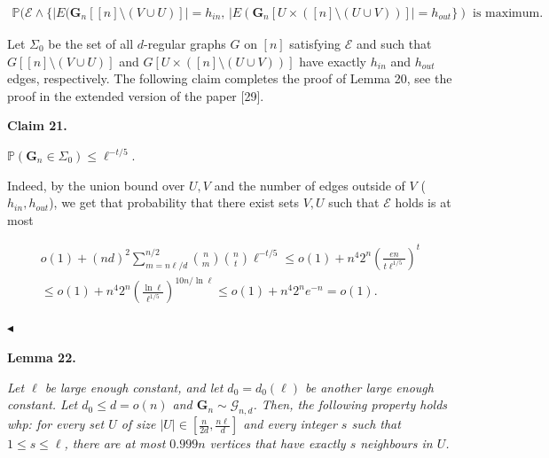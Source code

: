 \documentclass[10pt,a4paper]{article}
\begin{document}
\[\begin{gathered}
\mathbb{P}(\mathcal{E}\wedge\{|E(\mathbf{G}_{n}[[n]\setminus(V\cup U)]|=h_{in},\,|E(\mathbf{G}_{n}[U\times([n]\setminus(U\cup V))]|=h_{out}\})\text{ is maximum}.
\end{gathered}\]


Let $\Sigma_{0}$ be the set of all $d$-regular graphs $G$ on $[n]$ satisfying $\mathcal{E}$ and such that $G[[n]\setminus(V\cup U)]$ and $G[U\times([n]\setminus(U\cup V))]$ have exactly $h_{in}$ and $h_{out}$ edges, respectively. The following claim completes the proof of Lemma 20, see the proof in the extended version of the paper [29].\par





\par\medskip\noindent\textbf{
Claim 21. 
}\par



$\mathbb{P}(\mathbf{G}_{n}\in\Sigma_{0})\leq\ell^{-t/5}$.\par






Indeed, by the union bound over $U,V$ and the number of edges outside of $V$ ($h_{in},h_{out}$), we get that probability that there exist sets $V,U$ such that $\mathcal{E}$ holds is at most\par


\[\begin{gathered}
\displaystyle o(1)+(nd)^{2} \displaystyle\sum_{m=n\ell/d}^{n/2}{n\choose m}{n\choose t}\ell^{-t/5}\leq o(1)+n^{4}2^{n}\left(\frac{en}{t\ell^{1/5}}\right)^{t} \\
\displaystyle\leq o(1)+n^{4}2^{n}\left(\frac{\ln\ell}{\ell^{1/5}}\right)^{10n/\ln\ell}\leq o(1)+n^{4}2^{n}e^{-n}=o(1).
\end{gathered}\]


$\blacktriangleleft$\par





\par\medskip\noindent\textbf{
\textbf{Lemma 22}\textbf{.}
}\par



\emph{Let $\ell$ be large enough constant, and let $d_{0}=d_{0}(\ell)$ be another large enough constant. Let $d_{0}\leq d=o(n)$ and $\mathbf{G}_{n}\sim\mathcal{G}_{n,d}$. Then, the following property holds whp: for every set $U$ of size $|U|\in[\frac{n}{2d},\frac{n\ell}{d}]$ and every integer $s$ such that $1\leq s\leq\ell$, there are at most $0.999n$ vertices that have exactly $s$ neighbours in $U$.}\par
\end{document}
